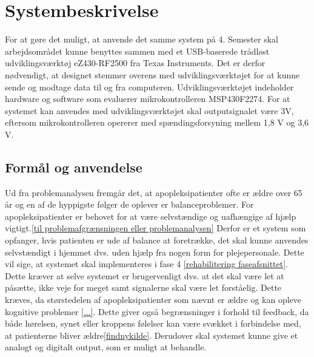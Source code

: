 \section{Systembeskrivelse}
For at gøre det muligt, at anvende det samme system på 4. Semester skal arbejdsområdet kunne benyttes sammen med et USB-baserede trådløst udviklingsværktøj eZ430-RF2500 fra Texas Instruments. Det er derfor nødvendigt, at designet stemmer overens med udviklingsværktøjet for at kunne sende og modtage data til og fra computeren. Udviklingsværktøjet indeholder hardware og software som evaluerer mikrokontrolleren MSP430F2274. For at systemet kan anvendes med udviklingsværktøjet skal outputsignalet være 3V, eftersom mikrokontrolleren opererer med spændingsforsyning mellem 1,8 V og 3,6 V.  

\subsection{Formål og anvendelse}
Ud fra problemanalysen fremgår det, at apopleksipatienter ofte er ældre over 65 år og en af de hyppigste følger de oplever er balanceproblemer. For apopleksipatienter er behovet for at være selvstændige og uafhængige af hjælp vigtigt.\ref{til problemafgrænsningen eller problemanalysen}  
Derfor er et system som opfanger, hvis patienten er ude af balance at foretrække, det skal kunne anvendes selvstændigt i hjemmet dvs. uden hjælp fra nogen form for plejepersonale. Dette vil sige, at systemet skal implementeres i fase 4 \ref{rehabilitering faseafsnittet}. Dette kræver at selve systemet er brugervenligt dvs. at det skal være let at påsætte, ikke veje for meget samt signalerne skal være let forståelig. Dette kræves, da størstedelen af apopleksipatienter som nævnt er ældre og kan opleve kognitive problemer \ref{...}. Dette giver også begrænsninger i forhold til feedback, da både hørelsen, synet eller kroppens følelser kan være svækket i forbindelse med, at patienterne bliver ældre\ref{findnykilde}. Derudover skal systemet kunne give et analogt og digitalt output, som er muligt at behandle.


